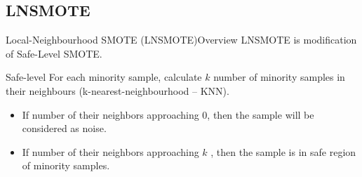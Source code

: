 \documentclass[english]{beamer}
\begin{document}
\subsection{LNSMOTE}

\begin{frame}{Local-Neighbourhood SMOTE (LNSMOTE)}{Overview}
	LNSMOTE is modification of Safe-Level SMOTE.
	\begin{block}{Safe-level}
		For each minority sample, calculate $k$ number of minority samples in
		their neighbours (k-nearest-neighbourhood -- KNN).

		\begin{itemize}
		\item If number of their neighbors approaching 0, then the sample will
		be considered as noise.
		\item If number of their neighbors approaching $k$ , then the sample is
		in safe region of minority samples.
		\end{itemize}
	\end{block}
\end{frame}
\end{document}
